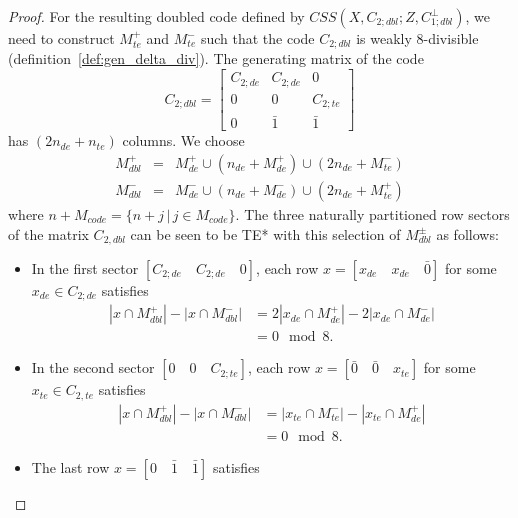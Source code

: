 \documentclass[journal]{IEEEtran}
\begin{document}
\begin{proof}
    For the resulting doubled code defined by $CSS(X,C_{2;dbl};Z,C_{1;dbl}^\perp)$, we need to construct $M_{te}^+$ and $M_{te}^-$ such that the code $C_{2;dbl}$ is weakly $8$-divisible (definition~\ref{def:gen_delta_div}). The generating matrix of the code 
    \begin{equation}
    C_{2;dbl}= \begin{bmatrix}
                    C_{2;de} &  C_{2;de} &  0 \\
                    0 & 0 &  C_{2;te} \\
                    0 & \bar{1} & \bar{1}
                \end{bmatrix}
    \end{equation}has $(2n_{de}+n_{te})$ columns. We choose
    \begin{eqnarray}
        M_{dbl}^+&=&M_{de}^+ \cup (n_{de}+M_{de}^+)\cup(2n_{de}+M_{te}^-) \\M_{dbl}^-&=&M_{de}^- \cup (n_{de}+M_{de}^-)\cup(2n_{de}+M_{te}^+)
    \end{eqnarray}
    where $n+M_{code}=\{n+j\,|\,j\in M_{code}\}$. The three naturally partitioned row sectors of the matrix $C_{2,dbl}$ can be seen to be TE* with this selection of $M_{dbl}^{\pm}$ as follows:
    \begin{itemize}
        \item In the first sector $[C_{2;de}\quad C_{2;de} \quad 0]$, each row $x = [x_{de}\quad x_{de} \quad \bar{0}]$ for some $x_{de}\in C_{2;de}$ satisfies 
        \begin{equation}
        \begin{split}
        |x \cap M_{dbl}^+|-|x \cap M_{dbl}^-|&=2|x_{de}\cap M_{de}^+|-2|x_{de}\cap M_{de}^-|\\
        &=0\mod{8}.
        \end{split}
        \end{equation}
        \item In the second sector $[0\quad 0 \quad C_{2;te}]$, each row $x = [\bar{0}\quad \bar{0} \quad x_{te}]$ for some $x_{te}\in C_{2,te}$ satisfies 
       \begin{equation}
       \begin{split}
        |x \cap M_{dbl}^+|-|x \cap M_{dbl}^-|&=|x_{te}\cap M_{te}^-|-|x_{te}\cap M_{de}^+|\\
        &=0\mod{8}.
        \end{split}
        \end{equation}        
        \item The last row $x=[0\quad \bar{1} \quad \bar{1}]$ satisfies

\end{itemize}
\end{proof}
\end{document}
